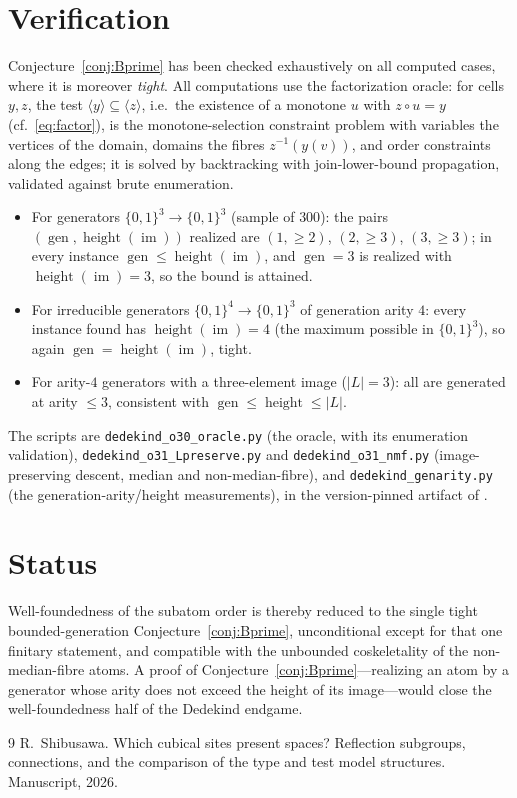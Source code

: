 \documentclass[11pt]{amsart}
\theoremstyle{plain}
\theoremstyle{definition}
\newcommand{\B}{\{0,1\}}
\newcommand{\im}{\operatorname{im}}
\newcommand{\hgt}{\operatorname{height}}
\newcommand{\gen}{\operatorname{gen}}
\newcommand{\atom}[1]{\langle #1 \rangle}
\begin{document}
\section{Verification}

Conjecture~\ref{conj:Bprime} has been checked exhaustively on all
computed cases, where it is moreover \emph{tight}.  All computations use
the factorization oracle: for cells $y,z$, the test $\atom{y}\subseteq
\atom{z}$, i.e.\ the existence of a monotone $u$ with $z\circ u=y$
(cf.\ \eqref{eq:factor}), is the monotone-selection constraint problem
with variables the vertices of the domain, domains the fibres
$z^{-1}(y(v))$, and order constraints along the edges; it is solved by
backtracking with join-lower-bound propagation, validated against
brute enumeration.

\begin{itemize}
\item For generators $\B^{3}\to\B^{3}$ (sample of $300$): the pairs
  $(\gen,\hgt(\im))$ realized are $(1,\ge2)$, $(2,\ge3)$, $(3,\ge3)$;
  in every instance $\gen\le\hgt(\im)$, and $\gen=3$ is realized with
  $\hgt(\im)=3$, so the bound is attained.
\item For irreducible generators $\B^{4}\to\B^{3}$ of generation arity
  $4$: every instance found has $\hgt(\im)=4$ (the maximum possible in
  $\B^{3}$), so again $\gen=\hgt(\im)$, tight.
\item For arity-$4$ generators with a three-element image ($|L|=3$):
  all are generated at arity $\le 3$, consistent with
  $\gen\le\hgt\le|L|$.
\end{itemize}

\noindent The scripts are \texttt{dedekind\_o30\_oracle.py} (the oracle,
with its enumeration validation), \texttt{dedekind\_o31\_Lpreserve.py}
and \texttt{dedekind\_o31\_nmf.py} (image-preserving descent, median and
non-median-fibre), and \texttt{dedekind\_genarity.py} (the
generation-arity/height measurements), in the version-pinned artifact of
\cite{PaperW}.

\section{Status}

Well-foundedness of the subatom order is thereby reduced to the single
tight bounded-generation Conjecture~\ref{conj:Bprime}, unconditional
except for that one finitary statement, and compatible with the
unbounded coskeletality of the non-median-fibre atoms.  A proof of
Conjecture~\ref{conj:Bprime}---realizing an atom by a generator whose
arity does not exceed the height of its image---would close the
well-foundedness half of the Dedekind endgame.

\begin{thebibliography}{9}
R.~Shibusawa.
\newblock Which cubical sites present spaces?  Reflection subgroups,
  connections, and the comparison of the type and test model
  structures.
\newblock Manuscript, 2026.
\end{thebibliography}
\end{document}
